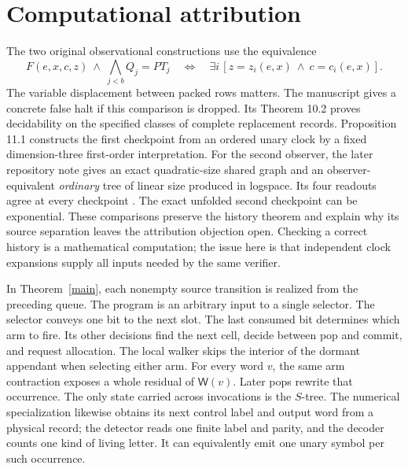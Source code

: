 \documentclass[11pt,letterpaper,oneside,reqno]{amsart}
\newcommand{\word}{\mathsf W}
\begin{document}
\section{Computational attribution}\label{attribution}
The two original observational constructions use the equivalence
\[
 F(e,x,c,z)\ \land\ \bigwedge_{j<b}Q_j=PT_j
 \quad\Longleftrightarrow\quad
 \exists i\,[z=z_i(e,x)\ \land\ c=c_i(e,x)] .
\]
The variable displacement between packed rows matters. The manuscript gives a concrete false halt if this comparison is dropped. Its Theorem 10.2 proves decidability on the specified classes of complete replacement records. Proposition 11.1 constructs the first checkpoint from an ordered unary clock by a fixed dimension-three first-order interpretation. For the second observer, the later repository note gives an exact quadratic-size shared graph and an observer-equivalent \emph{ordinary} tree of linear size produced in logspace. Its four readouts agree at every checkpoint \cite{observed,replacement}. The exact unfolded second checkpoint can be exponential. These comparisons preserve the history theorem and explain why its source separation leaves the attribution objection open. Checking a correct history is a mathematical computation; the issue here is that independent clock expansions supply all inputs needed by the same verifier.

In Theorem~\ref{main}, each nonempty source transition is realized from the preceding queue. The program is an arbitrary input to a single selector. The selector conveys one bit to the next slot. The last consumed bit determines which arm to fire. Its other decisions find the next cell, decide between pop and commit, and request allocation. The local walker skips the interior of the dormant appendant when selecting either arm. For every word \(v\), the same arm contraction exposes a whole residual of \(\word(v)\). Later pops rewrite that occurrence. The only state carried across invocations is the \(S\)-tree. The numerical specialization likewise obtains its next control label and output word from a physical record; the detector reads one finite label and parity, and the decoder counts one kind of living letter. It can equivalently emit one unary symbol per such occurrence.
\end{document}
